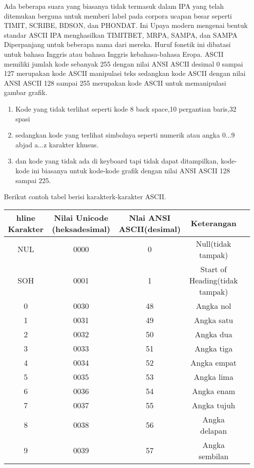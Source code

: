 \begin{enumerate}
	Ada beberapa suara yang biasanya tidak termasuk dalam IPA yang telah ditemukan
	berguna untuk memberi label pada corpora ucapan besar seperti TIMIT, SCRIBE, BDSON, dan PHONDAT. Ini
	Upaya modern mengenai bentuk standar ASCII IPA menghasilkan TIMITBET, MRPA, SAMPA, dan
	SAMPA Diperpanjang untuk beberapa nama dari mereka. Huruf fonetik ini dibatasi untuk bahasa Inggris atau bahasa Inggris kebahasa-bahasa Eropa.
	ASCII memiliki jumlah kode sebanyak 255 dengan nilai ANSI ASCII desimal 0 sampai 127 merupakan kode ASCII manipulasi teks sedangkan kode ASCII dengan nilai ANSI ASCII 128 sampai 255 merupakan kode ASCII untuk memanipulasi gambar grafik.
	\begin{enumerate}
		\item Kode yang tidak terlihat seperti kode 8 back space,10 pergantian baris,32 spasi 
		\item sedangkan kode yang terlihat simbolnya seperti numerik atau angka 0...9 abjad a...z karakter khusus.
		\item dan kode yang tidak ada di keyboard tapi tidak dapat ditampilkan, kode-kode ini biasanya untuk kode-kode grafik dengan nilai ANSI ASCII 128 sampai 225.
  \end{enumerate}

	Berikut contoh tabel berisi karakterk-karakter ASCII.
\begin{table}[H]
\begin{tabular}{|c|c|c|c|c|}
hline
Karakter & Nilai Unicode (heksadesimal) & Nlai ANSI ASCII(desimal) & Keterangan\\
\hline
NUL & 0000 & 0 & Null(tidak tampak)\\
SOH & 0001 & 1 & Start of Heading(tidak tampak)\\
0 & 0030 & 48 & Angka nol\\
1 & 0031 & 49 & Angka satu\\
2 & 0032 & 50 & Angka dua\\
3 & 0033 & 51 & Angka tiga\\
4 & 0034 & 52 & Angka empat\\
5 & 0035 & 53 & Angka lima\\
6 & 0036 & 54 & Angka enam\\
7 & 0037 & 55 & Angka tujuh\\
8 & 0038 & 56 & Angka delapan\\
9 & 0039 & 57 & Angka sembilan\\
\hline
\end{tabular}
\end{table}


\end{enumerate}
